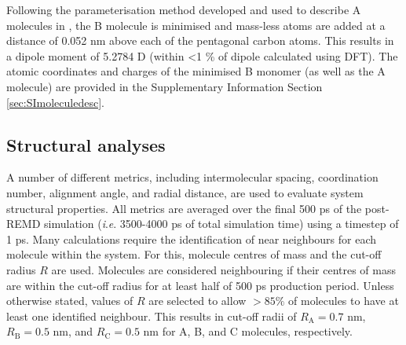 Following the parameterisation method developed and used to describe A molecules in \citet{bowal2019ion}, the B molecule is minimised and mass-less atoms are added at a distance of 0.052 nm above each of the pentagonal carbon atoms. This results in a dipole moment of 5.2784 D (within <1 \% of dipole calculated using DFT). The atomic coordinates and charges of the minimised B monomer (as well as the A molecule) are provided in the Supplementary Information Section \ref{sec:SImoleculedesc}.



\subsection{Structural analyses}
A number of different metrics, including intermolecular spacing, coordination number, alignment angle, and radial distance, are used to evaluate system structural properties. All metrics are averaged over the  final 500 ps of the post-REMD simulation (\textit{i}.\textit{e}. 3500-4000 ps of total simulation time) using a timestep of 1 ps. 
Many calculations require the identification of near neighbours for each molecule within the system. For this, molecule centres of mass and the cut-off radius $R$ are used. Molecules are considered neighbouring if their centres of mass are within the cut-off radius for at least half of 500 ps production period. Unless otherwise stated, values of $R$ are selected to allow $>85\%$ of molecules to have at least one identified neighbour. This results in cut-off radii of $R_{\text{A}} = 0.7$ nm, $R_{\text{B}} = 0.5$ nm, and $R_{\text{C}} = 0.5$ nm for A, B, and C molecules, respectively. 


